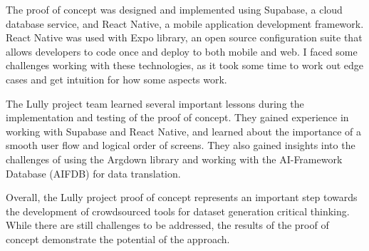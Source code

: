 \documentclass{report}
\begin{document}
The proof of concept was designed and implemented using Supabase, a cloud database service, and React Native, a mobile application development framework. React Native was used with Expo library, an open source configuration suite that allows developers to code once and deploy to both mobile and web. I faced some challenges working with these technologies, as it took some time to work out edge cases and get intuition for how some aspects work.

The Lully project team learned several important lessons during the implementation and testing of the proof of concept. They gained experience in working with Supabase and React Native, and learned about the importance of a smooth user flow and logical order of screens. They also gained insights into the challenges of using the Argdown library and working with the AI-Framework Database (AIFDB) for data translation.

Overall, the Lully project proof of concept represents an important step towards the development of crowdsourced tools for dataset generation critical thinking. While there are still challenges to be addressed, the results of the proof of concept demonstrate the potential of the approach.

\newpage

\printbibliography
\end{document}
